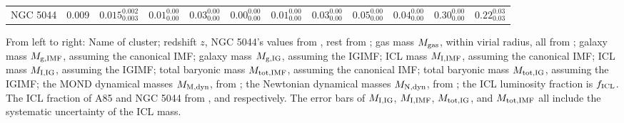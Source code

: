 \begin{table}
\begin{ruledtabular}
\begin{tabular}{c c c c c c c c c c c c}
     NGC 5044 & 0.009 & $0.015^{0.002}_{0.003}$ & $0.01^{0.00}_{0.00}$ & $0.03^{0.00}_{0.00}$ & $0.00^{0.00}_{0.00}$ & $0.01^{0.00}_{0.00}$ & $0.03^{0.00}_{0.00}$ & $0.05^{0.00}_{0.00}$ & $0.04^{0.00}_{0.00}$ & $0.30^{0.00}_{0.00}$ & $0.22^{0.03}_{0.03}$ \\    
     \end{tabular}
     \end{ruledtabular}
     \footnotesize{From left to right: Name of cluster; redshift $z$, NGC 5044's values from \citet{zhang2011hiflugcs}, rest from \citet{fasano2006wings}; gas mass $M_{\rm gas}$, within virial radius, all from \citet{brownstein2006galaxy}; galaxy mass $M_{\rm g,IMF}$, assuming the canonical IMF; galaxy mass $M_{\rm g,IG}$, assuming the IGIMF; ICL mass $M_{\rm I,IMF}$, assuming the canonical IMF; ICL mass $M_{\rm I,IG}$, assuming the IGIMF; total baryonic mass $M_{\rm tot,IMF}$, assuming the canonical IMF; total baryonic mass $M_{\rm tot,IG}$, assuming the IGIMF; the MOND dynamical masses $M_{\rm M,dyn}$, from \citet{brownstein2006galaxy}; the Newtonian dynamical masses $M_{\rm N,dyn}$, from \citet{brownstein2006galaxy}; the ICL luminosity fraction is $f_{\rm ICL}$.     
     The ICL fraction of A85 and NGC 5044 from \citet{montes2021buildup}, and \citet{ragusa2023does} respectively. The error bars of $M_{\rm I,IG}$, $M_{\rm I,IMF}$, $M_{\rm tot,IG}$, and $M_{\rm tot,IMF}$ all include the systematic uncertainty of the ICL mass. }
     \end{table}




